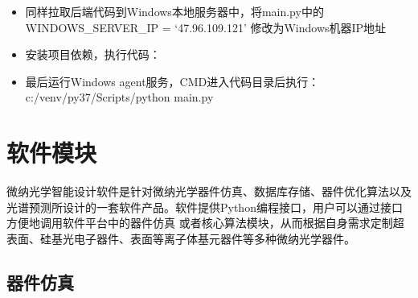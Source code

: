 \documentclass[a4paper,10pt,english]{sphinxmanual}
\begin{document}
{{\begin{itemize}
\item {} 
\sphinxAtStartPar
同样拉取后端代码到Windows本地服务器中，将main.py中的WINDOWS\_SERVER\_IP = ‘47.96.109.121’ 修改为Windows机器IP地址

\item {} 
\sphinxAtStartPar
安装项目依赖，执行代码：

\begin{sphinxVerbatim}[commandchars=\\\{\}]
    
 
    
\end{sphinxVerbatim}

\item {} 
\sphinxAtStartPar
最后运行Windows agent服务，CMD进入代码目录后执行：c:/venv/py37/Scripts/python main.py

\end{itemize}

\sphinxstepscope


\chapter{软件模块}
\label{\detokenize{_u8f6f_u4ef6_u6a21_u5757_u4ecb_u7ecd/index:id1}}\label{\detokenize{_u8f6f_u4ef6_u6a21_u5757_u4ecb_u7ecd/index::doc}}
\sphinxAtStartPar
微纳光学智能设计软件是针对微纳光学器件仿真、数据库存储、器件优化算法以及光谱预测所设计的一套软件产品。软件提供Python编程接口，用户可以通过接口方便地调用软件平台中的器件仿真
或者核心算法模块，从而根据自身需求定制超表面、硅基光电子器件、表面等离子体基元器件等多种微纳光学器件。

\sphinxstepscope


\section{器件仿真}
\label{\detokenize{_u8f6f_u4ef6_u6a21_u5757_u4ecb_u7ecd/_u5668_u4ef6_u4eff_u771f/contents:id1}}\label{\detokenize{_u8f6f_u4ef6_u6a21_u5757_u4ecb_u7ecd/_u5668_u4ef6_u4eff_u771f/contents::doc}}

}}
\end{document}
